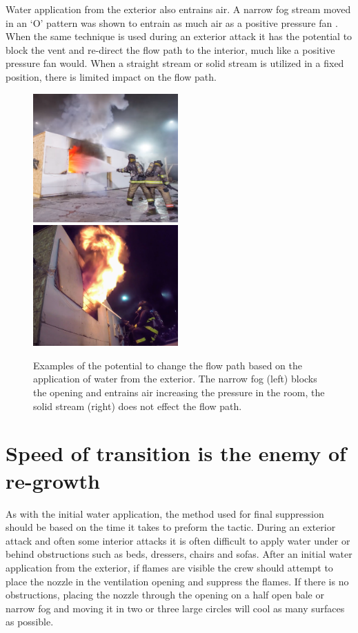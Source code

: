 \documentclass[12pt,oneside]{book}
\begin{document}
Water application from the exterior also entrains air. A narrow fog stream moved in an `O' pattern was shown to entrain as much air as a positive pressure fan \cite{Weinchenk_airentrainment}. When the same technique is used during an exterior attack it has the potential to block the vent and re-direct the flow path to the interior, much like a positive pressure fan would. When a straight stream or solid stream is utilized in a fixed position, there is limited impact on the flow path. 

\begin{figure}[H]
\centering
\includegraphics[width=0.495\textwidth]{../0_Images/Tactical_Considerations/Flow_Path_Effect/Exterior_Fog}
\includegraphics[width=0.495\textwidth]{../0_Images/Tactical_Considerations/Flow_Path_Effect/Exterior_SS.jpg}
\caption[Exterior Application Can Change Flow path]{Examples of the potential to change the flow path based on the application of water from the exterior. The narrow fog (left) blocks the opening and entrains air increasing the pressure in the room, the solid stream (right) does not effect the flow path.}
\label{fig:flow_path_effect_TC_exerior_application}
\end{figure}

\section{Speed of transition is the enemy of re-growth} \label{tc:speed_enemy_regrowth}
As with the initial water application, the method used for final suppression should be based on the time it takes to preform the tactic. During an exterior attack and often some interior attacks it is often difficult to apply water under or behind obstructions such as beds, dressers, chairs and sofas. After an initial water application from the exterior, if flames are visible the crew should attempt to place the nozzle in the ventilation opening and suppress the flames. If there is no obstructions, placing the nozzle through the opening on a half open bale or narrow fog and moving it in two or three large circles will cool as many surfaces as possible. 
\end{document}

